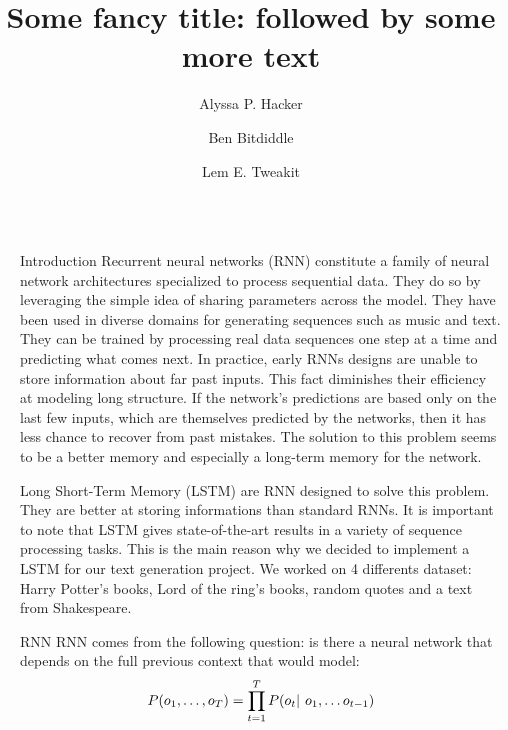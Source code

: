\documentclass[final]{beamer}
\title{Some fancy title: followed by some more text}
\author{Alyssa P. Hacker \inst{1} \and Ben Bitdiddle \inst{2} \and Lem E. Tweakit \inst{2}}
\institute[shortinst]{\inst{1} Some Institute \samelineand \inst{2} Another Institute}
\newlength{\sepwidth}
\newlength{\colwidth}
\newcommand{\separatorcolumn}{\begin{column}{\sepwidth}\end{column}}
\begin{document}
\begin{frame}[t]
\begin{columns}[t]
\separatorcolumn

\begin{column}{\colwidth}

\begin{block}{Introduction}
Recurrent neural networks (RNN) constitute a family of neural network architectures
specialized to process sequential data. They do so by leveraging the simple idea
of sharing parameters across the model\cite{deeplearning}. They have been used in diverse domains for
generating sequences such as music and text. They can be trained by processing
real data sequences one step at a time and predicting what comes next.
In practice, early RNNs designs are unable to store information about far past
inputs. This fact diminishes their efficiency at modeling long structure. If
the network's predictions are based only on the last few inputs, which are
themselves predicted by the networks, then it has less chance to recover from
past mistakes. The solution to this problem seems to be a better memory and
especially a long-term memory for the network. 

Long Short-Term Memory (LSTM) are RNN designed to solve this problem. They are
better at storing informations than standard RNNs. It is important to note that
LSTM gives state-of-the-art results in a variety of sequence processing tasks.
This is the main reason why we decided to implement a LSTM for our text
generation project. We worked on 4 differents dataset: Harry Potter's books,
Lord of the ring's books, random quotes and a text from Shakespeare. 
\end{block}

\begin{block}{RNN} 
RNN comes from the following question: is there a neural network that depends
on the full previous context that would model: \begin{align*}
    P(o_1, \dots , o_T) = \prod_{t = 1}^T P(o_t | \hspace{0.05in} o_1, \ldots o_{t-1})
\end{align*}


\end{block}
\end{column}
\end{columns}
\end{frame}
\end{document}
